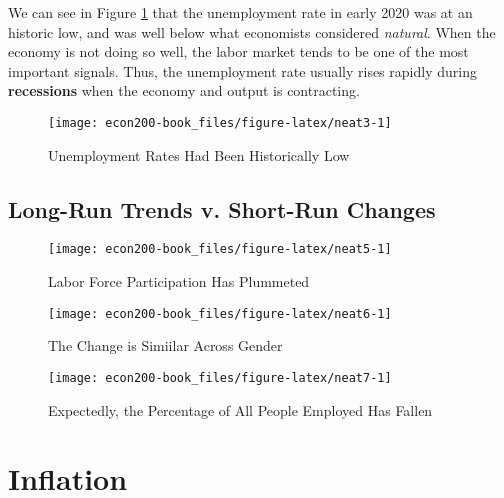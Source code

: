 \documentclass[
]{book}
\begin{document}
We can see in Figure \ref{fig:neat3} that the unemployment rate in early 2020 was at an historic low, and was well below what economists considered \emph{natural}. When the economy is not doing so well, the labor market tends to be one of the most important signals. Thus, the unemployment rate usually rises rapidly during \textbf{recessions} when the economy and output is contracting.

\begin{figure}

{\centering \texttt{[image: econ200-book\_files/figure-latex/neat3-1]} 

}

\caption{Unemployment Rates Had Been Historically Low}\label{fig:neat3}
\end{figure}

\hypertarget{long-run-trends-v.-short-run-changes}{%
\section{Long-Run Trends v. Short-Run Changes}\label{long-run-trends-v.-short-run-changes}}

\begin{figure}

{\centering \texttt{[image: econ200-book\_files/figure-latex/neat5-1]} 

}

\caption{Labor Force Participation Has Plummeted}\label{fig:neat5}
\end{figure}

\begin{figure}

{\centering \texttt{[image: econ200-book\_files/figure-latex/neat6-1]} 

}

\caption{The Change is Simiilar Across Gender}\label{fig:neat6}
\end{figure}

\begin{figure}

{\centering \texttt{[image: econ200-book\_files/figure-latex/neat7-1]} 

}

\caption{Expectedly, the Percentage of All People Employed Has Fallen}\label{fig:neat7}
\end{figure}

\hypertarget{inflation}{%
\chapter{Inflation}\label{inflation}}
\end{document}
